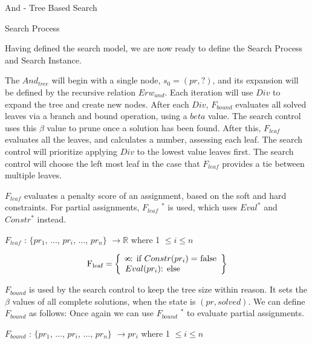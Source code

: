 \documentclass[10pt]{article}
\def\infinity{\rotatebox{90}{8}}
\begin{document}
{\centering 
\Huge And - Tree Based Search
\bigskip

\huge Search Process
\par}

\bigskip
\bigskip

Having defined the search model, we are now ready to define the Search Process and Search Instance.

\bigskip

The $And_{tree}$ will begin with a single node, $s_0 = (pr, ?)$, and its expansion will be defined by the recursive relation $Erw_{and}$. Each iteration will use $Div$ to expand the tree and create new nodes. After each $Div$, $F_{bound}$ evaluates all solved leaves via a branch and bound operation, using a $beta$ value. The search control uses this $\beta$ value to prune once a solution has been found. After this, $F_{leaf}$  evaluates all the leaves, and calculates a number, assessing each leaf. The search control will prioritize applying $Div$ to the lowest value leaves first. The search control will choose the left most leaf in the case that $F_{leaf}$ provides a tie between multiple leaves.
\bigskip
\bigskip

$F_{leaf}$ evaluates a penalty score of an assignment, based on the soft and hard constraints. For partial assignments, $F_{leaf}$ $^*$ is used, which uses $Eval^*$ and $Constr^*$ instead. 

\bigskip
$F_{leaf}$ : $\{pr_1$, ..., $pr_i$, ..., $pr_n \} $  $ \to \mathbb{R} $    where 1 $\leq i\leq n$



 \[
          \text{F\textsubscript{leaf}} = \left\{\begin{array}{ll}
            \infinity $: 	 if $Constr(pr_i)=$ false$ \\
            Eval(pr_i) $: 	 else$\\
            
            \end{array}\right\}
      \]

\bigskip
\bigskip


$F_{bound}$ is used by the search control to keep the tree size within reason. It sets the $\beta$ values of all complete solutions, when the state is $(pr, solved)$. 
We can define $F_{bound}$ as follows: Once again we can use $F_{bound}$ $^*$ to evaluate partial assignments.

\bigskip
$F_{bound}$ : $\{pr_1$, ..., $pr_i$, ..., $pr_n \} $  $ \to pr_i $    where 1 $\leq i\leq n$
\end{document}

